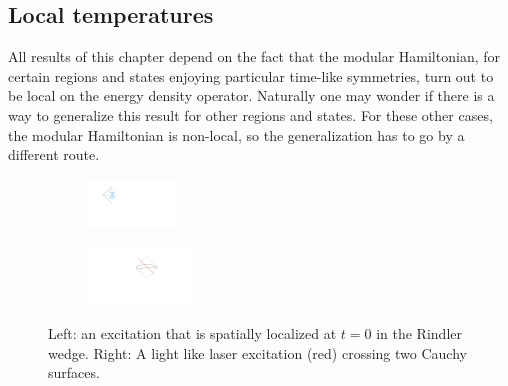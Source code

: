\documentclass[11pt]{article}
\numberwithin{equation}{section}
\begin{document}
\subsection{Local temperatures}

All results of this chapter depend on the fact that the modular Hamiltonian, for certain regions and states enjoying particular time-like symmetries, turn out to be local on the energy density operator. Naturally one may wonder if there is a way to generalize this result for other regions and states. For these other cases, the modular Hamiltonian is non-local, so the generalization has to go by a different route. 

\begin{figure}[t]  
\begin{subfigure}
\centering
\hspace{1.3cm}\includegraphics[width=0.26\textwidth]{uno.pdf}
\end{subfigure}
\hspace{2cm}
\begin{subfigure}
\centering
\includegraphics[width=0.3\textwidth]{dos.pdf}
\end{subfigure}
\captionsetup{width=0.9\textwidth}
\caption{Left: an excitation that is spatially localized at $t=0$ in the Rindler wedge. Right: A light like laser excitation (red) crossing two Cauchy surfaces.}
\label{rayo}
\end{figure}  
\end{document}
